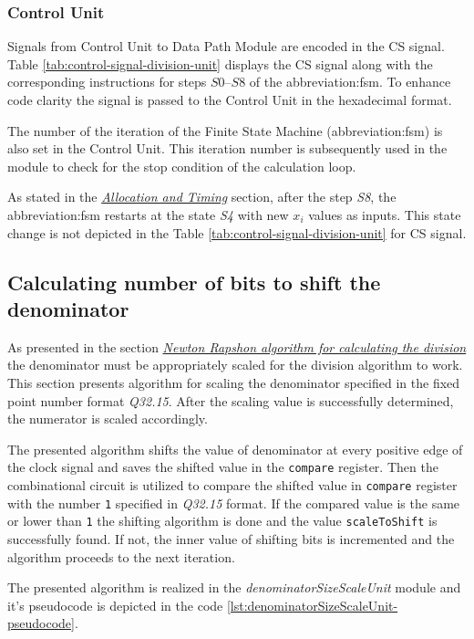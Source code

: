 \documentclass[a4paper, twoside, 11pt]{article}
\newcommand{\fbar}{\FloatBarrier}
\begin{document}
\fbar
\subsubsection{Control Unit}\label{subsubsec:division-control-unit}
Signals from Control Unit to Data Path Module are encoded in the CS signal. Table \ref{tab:control-signal-division-unit} displays the CS signal along with the corresponding instructions for steps $S0$–$S8$ of the \gls{abbreviation:fsm}. To enhance code clarity the signal is passed to the Control Unit in the hexadecimal format.\par
The number of the iteration of the Finite State Machine (\gls{abbreviation:fsm}) is also set in the Control Unit. This iteration number is subsequently used in the module to check for the stop condition of the calculation loop.\par
As stated in the \hyperref[subsubsec:division-allocation-and-timing]{\textit{Allocation and Timing}} section, after the step \textit{S8}, the \gls{abbreviation:fsm} restarts at the state \textit{S4} with new $x_i$ values as inputs. This state change is not depicted in the Table \ref{tab:control-signal-division-unit} for CS signal.


\fbar

\subsection{Calculating number of bits to shift the denominator}\label{subsec:calculating-number-of-bits-to-shift-the-denominator}
As presented in the section \hyperref[subsection:newton-raphson-algorithm-for-calculating-the-division]{\textit{Newton Rapshon algorithm for calculating the division}} the denominator must be appropriately scaled for the division algorithm to work. This section presents algorithm for scaling the denominator specified in the fixed point number format \textit{Q32.15}. After the scaling value is successfully determined, the numerator is scaled accordingly.
\par
The presented algorithm shifts the value of denominator at every positive edge of the clock signal and saves the shifted value in the \texttt{compare} register. Then the combinational circuit is utilized to compare the shifted value in \texttt{compare} register with the number \texttt{1} specified in \textit{Q32.15} format. If the compared value is the same or lower than \texttt{1} the shifting algorithm is done and the value \texttt{scaleToShift} is successfully found. If not, the inner value of shifting bits is incremented and the algorithm proceeds to the next iteration.\par
The presented algorithm is realized in the \textit{denominatorSizeScaleUnit} module and it's pseudocode is depicted in the code \ref{lst:denominatorSizeScaleUnit-pseudocode}.
\end{document}

